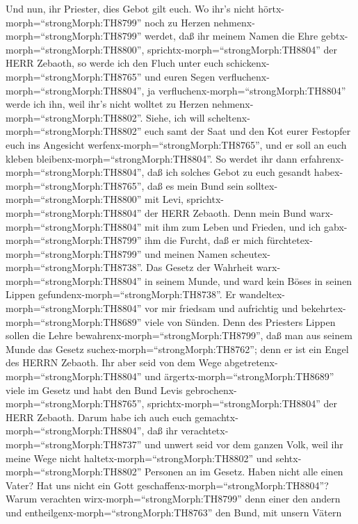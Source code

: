  Und nun, ihr Priester, dies Gebot gilt euch. 
Wo ihr's nicht hörtx-morph=``strongMorph:TH8799'' noch zu Herzen
nehmenx-morph=``strongMorph:TH8799'' werdet, daß ihr meinem Namen die
Ehre gebtx-morph=``strongMorph:TH8800'',
sprichtx-morph=``strongMorph:TH8804'' der HERR Zebaoth, so werde ich den
Fluch unter euch schickenx-morph=``strongMorph:TH8765'' und euren Segen
verfluchenx-morph=``strongMorph:TH8804'', ja
verfluchenx-morph=``strongMorph:TH8804'' werde ich ihn, weil ihr's nicht
wolltet zu Herzen nehmenx-morph=``strongMorph:TH8802''. 
Siehe, ich will scheltenx-morph=``strongMorph:TH8802'' euch samt der
Saat und den Kot eurer Festopfer euch ins Angesicht
werfenx-morph=``strongMorph:TH8765'', und er soll an euch kleben
bleibenx-morph=``strongMorph:TH8804''.  So werdet ihr dann
erfahrenx-morph=``strongMorph:TH8804'', daß ich solches Gebot zu euch
gesandt habex-morph=``strongMorph:TH8765'', daß es mein Bund sein
solltex-morph=``strongMorph:TH8800'' mit Levi,
sprichtx-morph=``strongMorph:TH8804'' der HERR Zebaoth. 
Denn mein Bund warx-morph=``strongMorph:TH8804'' mit ihm zum Leben und
Frieden, und ich gabx-morph=``strongMorph:TH8799'' ihm die Furcht, daß
er mich fürchtetex-morph=``strongMorph:TH8799'' und meinen Namen
scheutex-morph=``strongMorph:TH8738''.  Das Gesetz der
Wahrheit warx-morph=``strongMorph:TH8804'' in seinem Munde, und ward
kein Böses in seinen Lippen gefundenx-morph=``strongMorph:TH8738''. Er
wandeltex-morph=``strongMorph:TH8804'' vor mir friedsam und aufrichtig
und bekehrtex-morph=``strongMorph:TH8689'' viele von Sünden.
 Denn des Priesters Lippen sollen die Lehre
bewahrenx-morph=``strongMorph:TH8799'', daß man aus seinem Munde das
Gesetz suchex-morph=``strongMorph:TH8762''; denn er ist ein Engel des
HERRN Zebaoth.  Ihr aber seid von dem Wege
abgetretenx-morph=``strongMorph:TH8804'' und
ärgertx-morph=``strongMorph:TH8689'' viele im Gesetz und habt den Bund
Levis gebrochenx-morph=``strongMorph:TH8765'',
sprichtx-morph=``strongMorph:TH8804'' der HERR Zebaoth. 
Darum habe ich auch euch gemachtx-morph=``strongMorph:TH8804'', daß ihr
verachtetx-morph=``strongMorph:TH8737'' und unwert seid vor dem ganzen
Volk, weil ihr meine Wege nicht haltetx-morph=``strongMorph:TH8802'' und
sehtx-morph=``strongMorph:TH8802'' Personen an im Gesetz. 
Haben nicht alle einen Vater? Hat uns nicht ein Gott
geschaffenx-morph=``strongMorph:TH8804''? Warum verachten
wirx-morph=``strongMorph:TH8799'' denn einer den andern und
entheilgenx-morph=``strongMorph:TH8763'' den Bund, mit unsern Vätern
